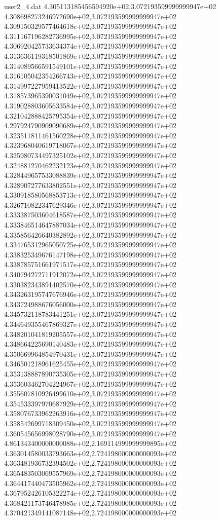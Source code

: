 \begin{filecontents}{user2_4.dat}
4.305113185456594920e+02,3.072193599999999947e+02
4.308698273246972690e+02,3.072193599999999947e+02
4.309150329577464618e+02,3.072193599999999947e+02
4.311167196282736995e+02,3.072193599999999947e+02
4.306920425733634374e+02,3.072193599999999947e+02
4.313636119318501869e+02,3.072193599999999947e+02
4.314089566591549101e+02,3.072193599999999947e+02
4.316105042354266743e+02,3.072193599999999947e+02
4.314997227959413522e+02,3.072193599999999947e+02
4.318573965390031049e+02,3.072193599999999947e+02
4.319028803605633584e+02,3.072193599999999947e+02
4.321042888425795354e+02,3.072193599999999947e+02
4.297924790909090689e+02,3.072193599999999947e+02
4.323511811461560228e+02,3.072193599999999947e+02
4.323968040619718067e+02,3.072193599999999947e+02
4.325980734497325102e+02,3.072193599999999947e+02
4.324881270462232123e+02,3.072193599999999947e+02
4.328449657533088839e+02,3.072193599999999947e+02
4.328907277633802551e+02,3.072193599999999947e+02
4.330918580568853713e+02,3.072193599999999947e+02
4.326710822347629346e+02,3.072193599999999947e+02
4.333387503604618587e+02,3.072193599999999947e+02
4.333846514647887034e+02,3.072193599999999947e+02
4.335856426640382892e+02,3.072193599999999947e+02
4.334765312965050725e+02,3.072193599999999947e+02
4.338325349676147198e+02,3.072193599999999947e+02
4.338785751661971517e+02,3.072193599999999947e+02
4.340794272711912072e+02,3.072193599999999947e+02
4.330382343891402570e+02,3.072193599999999947e+02
4.343263195747676946e+02,3.072193599999999947e+02
4.343724988676056000e+02,3.072193599999999947e+02
4.345732118783441251e+02,3.072193599999999947e+02
4.344649355467869327e+02,3.072193599999999947e+02
4.348201041819205557e+02,3.072193599999999947e+02
4.348664225690140483e+02,3.072193599999999947e+02
4.350669964854970431e+02,3.072193599999999947e+02
4.346501218961625455e+02,3.072193599999999947e+02
4.353138887890735305e+02,3.072193599999999947e+02
4.353603462704224967e+02,3.072193599999999947e+02
4.355607810926499610e+02,3.072193599999999947e+02
4.354533397970687929e+02,3.072193599999999947e+02
4.358076733962263916e+02,3.072193599999999947e+02
4.358542699718309450e+02,3.072193599999999947e+02
4.360545656998028790e+02,3.072193599999999947e+02
4.861343400000000088e+02,2.169114999999999895e+02
4.363014580033793663e+02,2.724198000000000093e+02
4.363481936732394502e+02,2.724198000000000093e+02
4.365483503069557969e+02,2.724198000000000093e+02
4.364417440473505962e+02,2.724198000000000093e+02
4.367952426105322274e+02,2.724198000000000093e+02
4.368421173746478985e+02,2.724198000000000093e+02
4.370421349141087148e+02,2.724198000000000093e+02

\end{filecontents}
